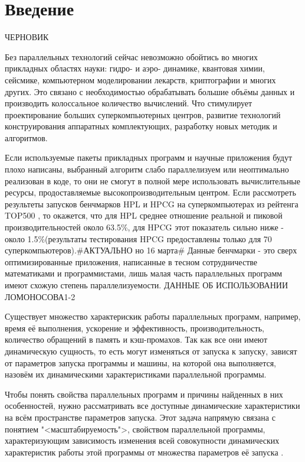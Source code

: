 \chapter{Введение}
	ЧЕРНОВИК

	Без параллельных технологий сейчас невозможно обойтись во многих прикладных областях науки: гидро- и аэро- динамике, квантовая химии, сейсмике, компьютерном моделировании лекарств, криптографии и многих других. Это связано с необходимостью обрабатывать большие объёмы данных и производить колоссальное количество вычислений. Что стимулирует проектирование больших суперкомпьютерных центров, развитие технологий конструирования аппаратных комплектующих, разработку новых методик и алгоритмов.

	Если используемые пакеты прикладных программ и научные приложения будут плохо написаны, выбранный алгоритм слабо параллелизуем или неоптимально реализован в коде, то они не смогут в полной мере использовать вычислительные ресурсы, продоставляемые высокопроизводительным центром. Если рассмотреть результеты запусков бенчмарков HPL и HPCG на суперкомпьютерах из рейтенга TOP500 \cite{top500}, то окажется, что для HPL среднее отношение реальной и пиковой производительностей около 63.5\%, для HPCG этот показатель сильно ниже - около 1.5\%(результаты тестирования HPCG предоставлены только для 70 суперкомпьютеров).\#АКТУАЛЬНО но 16 марта\# Данные бенчмарки - это сверх оптимизированные приложения, написанные в тесном сотрудничестве математиками и программистами, лишь малая часть параллельных программ имеют схожую степень параллелизуемости.
	ДАННЫЕ ОБ ИСПОЛЬЗОВАНИИ ЛОМОНОСОВА1-2



	Существует множество характерискик работы параллельных программ, например, время её выполнения, ускорение и эффективность, производительность, количество обращений в память и кэш-промахов. Так как все они имеют динамическую сущность, то есть могут изменяться от запуска к запуску, зависят от параметров запуска программы и машины, на которой она выполняется, назовём их динамическими характеристиками параллельной программы.

	Чтобы понять свойства параллельных программ и причины найденных в них особенностей, нужно рассматривать все доступные динамические характеристики на всём пространстве параметров запуска. Этот задача напрямую связана с понятием "<масштабируемость">, свойством параллельной программы, характеризующим зависимость изменения всей совокупности динамических характеристик работы этой программы от множества параметров её запуска \cite{scalability_def}.

